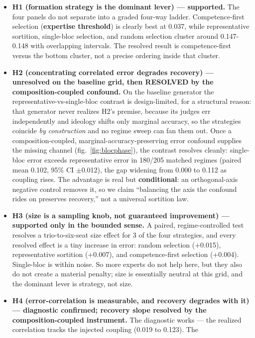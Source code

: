 \documentclass[
]{article}
\providecommand{\tightlist}{%
  \setlength{\itemsep}{0pt}\setlength{\parskip}{0pt}}
\begin{document}
\begin{itemize}
\tightlist
\item
  \textbf{H1 (formation strategy is the dominant lever) --- supported.}
  The four panels do not separate into a graded four-way ladder.
  Competence-first selection (\textbf{expertise threshold}) is clearly
  best at 0.037, while representative sortition, single-bloc selection,
  and random selection cluster around 0.147-0.148 with overlapping
  intervals. The resolved result is competence-first versus the bottom
  cluster, not a precise ordering inside that cluster.
\item
  \textbf{H2 (concentrating correlated error degrades recovery) ---
  unresolved on the baseline grid, then RESOLVED by the
  composition-coupled confound.} On the baseline generator the
  representative-vs-single-bloc contrast is design-limited, for a
  structural reason: that generator never realizes H2's premise, because
  its judges err independently and ideology shifts only marginal
  accuracy, so the strategies coincide \emph{by construction} and no
  regime sweep can fan them out. Once a composition-coupled,
  marginal-accuracy-preserving error confound supplies the missing
  channel (fig.~\ref{fig:blocphase}), the contrast resolves cleanly:
  single-bloc error exceeds representative error in 180/205 matched
  regimes (paired mean 0.102, 95\% CI \texorpdfstring{\ensuremath{\pm}}{+/-}0.012), the gap widening from
  0.000 to 0.112 as coupling rises. The advantage is real but
  \textbf{conditional}: an orthogonal-axis negative control removes it,
  so we claim ``balancing the axis the confound rides on preserves
  recovery,'' not a universal sortition law.
\item
  \textbf{H3 (size is a sampling knob, not guaranteed improvement) ---
  supported only in the bounded sense.} A paired, regime-controlled test
  resolves a trio-to-six-seat size effect for 3 of the four strategies,
  and every resolved effect is a tiny increase in error: random
  selection (+0.015), representative sortition (+0.007), and
  competence-first selection (+0.004). Single-bloc is within noise. So
  more experts do not help here, but they also do not create a material
  penalty; size is essentially neutral at this grid, and the dominant
  lever is strategy, not size.
\item
  \textbf{H4 (error-correlation is measurable, and recovery degrades
  with it) --- diagnostic confirmed; recovery slope resolved by the
  composition-coupled instrument.} The diagnostic works --- the realized
  correlation tracks the injected coupling (0.019 to 0.123). The

\end{itemize}
\end{document}
